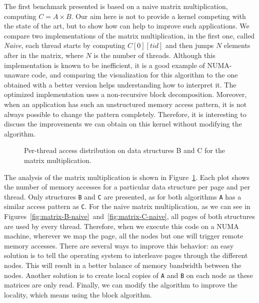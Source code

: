 The first benchmark presented is based on a naive matrix multiplication,
computing $C=A \times B$. Our aim here is not to provide a kernel competing with the
state of the art, but to show how \TABARNAC can help to improve such
applications. We compare two implementations of the matrix multiplication, in
the first one, called \emph{Naive}, each thread starts by computing
$C[0][tid]$ and then jumps $N$ elements after in the matrix, where $N$ is the
number of threads. Although this implementation is known to be inefficient, it is a
good example of NUMA-unaware code, and comparing the \TABARNAC visualization
for this algorithm to the one obtained with a better version helps understanding
how to interpret it.
The optimized implementation uses a non-recursive block
decomposition.
Moreover, when an application has such an unstructured memory access pattern, it
is not always possible to change the pattern completely. Therefore, it is
interesting to discuss the improvements we can obtain on this kernel without
modifying the algorithm.



\begin{figure}[!t]
    \centering
    \caption{Per-thread access distribution on data structures B and C for the
    matrix multiplication.}
    \label{fig:matrix-analysis}
\end{figure}
The analysis of the matrix multiplication is shown in Figure~\ref{fig:matrix-analysis}.
Each plot shows the number of memory accesses for a particular data structure
per page and per thread. Only structures \texttt{B} and \texttt{C} are
presented, as for both algorithms \texttt{A} has a similar access
pattern as \texttt{C}.
For the naive matrix multiplication, as we can see in
Figures~\ref{fig:matrix-B-naive}~and~\ref{fig:matrix-C-naive}, all pages of both structures are used by every
thread. Therefore, when we execute this code on a NUMA machine, wherever we
map the page, all the nodes but one will trigger remote memory accesses. There
are several ways to improve this behavior: an easy solution
is to tell the operating system to interleave pages through the different
nodes. This will result in a better balance of memory bandwidth between the
nodes. Another solution is to create local copies of \texttt{A} and
\texttt{B} on each node as these matrices are only read. Finally, we can modify
the algorithm to improve the locality, which means using the block algorithm.

